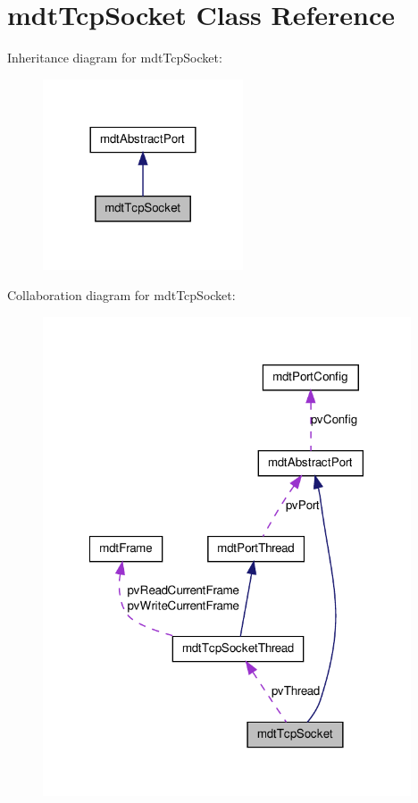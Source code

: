 \hypertarget{classmdt_tcp_socket}{
\section{mdtTcpSocket Class Reference}
\label{classmdt_tcp_socket}
}


Inheritance diagram for mdtTcpSocket:\nopagebreak
\begin{figure}[H]
\begin{center}
\leavevmode
\includegraphics[width=168pt]{classmdt_tcp_socket__inherit__graph}
\end{center}
\end{figure}


Collaboration diagram for mdtTcpSocket:\nopagebreak
\begin{figure}[H]
\begin{center}
\leavevmode
\includegraphics[width=309pt]{classmdt_tcp_socket__coll__graph}
\end{center}
\end{figure}
